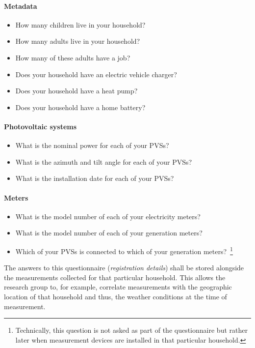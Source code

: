 \paragraph{Metadata}
\begin{itemize}
  \item How many children live in your household?
  \item How many adults live in your household?
  \item How many of these adults have a job?
  \item Does your household have an electric vehicle charger?
  \item Does your household have a heat pump?
  \item Does your household have a home battery?
\end{itemize}

\paragraph{Photovoltaic systems}
\begin{itemize}
  \item What is the nominal power for each of your \acp{PVS}?
  \item What is the azimuth and tilt angle for each of your \acp{PVS}?
  \item What is the installation date for each of your \acp{PVS}?
\end{itemize}

\paragraph{Meters}
\begin{itemize}
  \item What is the model number of each of your electricity meters?
  \item What is the model number of each of your generation meters?
  \item Which of your \acsp{PVS} is connected to which of your generation meters?~\footnote{Technically, this question is not asked as part of the questionnaire but rather later when measurement devices are installed in that particular household.}
\end{itemize}

The answers to this questionnaire (\textit{registration details}) shall be stored alongside the measurements  collected for that particular household. This allows the research group to, for example, correlate measurements with the geographic location of that household and thus, the weather conditions at the time of measurement.


